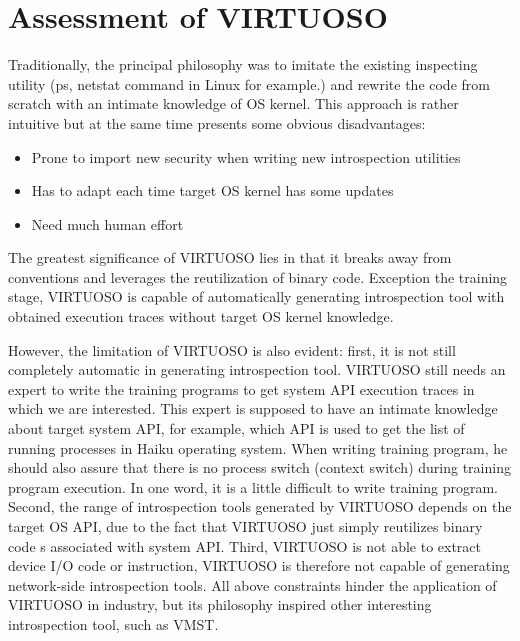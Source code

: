 \section{Assessment of VIRTUOSO}
Traditionally, the principal philosophy was to imitate the existing inspecting utility (ps, netstat command in Linux for example.) 
and rewrite the code from scratch with an intimate knowledge of OS kernel. This approach is rather intuitive but at the same time 
presents some obvious disadvantages:

\begin{itemize}
    \item Prone to import new security when writing new introspection utilities
    \item Has to adapt each time target OS kernel has some updates
    \item Need much human effort
 \end{itemize}
The greatest significance of VIRTUOSO lies in that it breaks away from conventions and leverages the reutilization of
binary code. Exception the training stage, VIRTUOSO is capable of automatically generating introspection tool with 
obtained execution traces without target OS kernel knowledge.

However, the limitation of VIRTUOSO is also evident: first, it is not still completely automatic in generating introspection
tool. VIRTUOSO still needs an expert to write the training programs to get system API execution traces in which we are
interested. This expert is supposed to have an intimate knowledge about target system API, for example, which API is used 
to get the list of running processes in Haiku operating system. When writing training program, he should also assure that
there is no process switch (context switch) during training program execution. In one word, it is a little difficult to 
write training program. Second, the range of introspection tools generated by VIRTUOSO depends on the target OS API, 
due to the fact that VIRTUOSO just simply reutilizes binary code s associated with system API. Third, VIRTUOSO is not
able to extract device I/O code or instruction, VIRTUOSO is therefore not capable of generating network-side introspection
tools. All above constraints hinder the application of VIRTUOSO in industry, but its philosophy inspired other interesting 
introspection tool, such as VMST.




